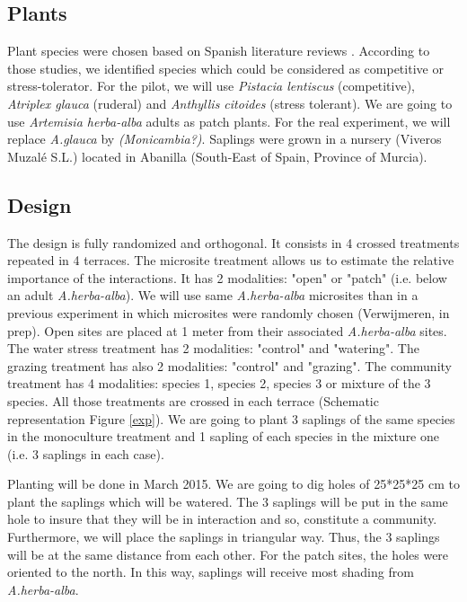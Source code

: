 \documentclass[12pt]{article} %
\begin{document}
\subsection{Plants}
Plant species were chosen based on Spanish literature reviews \citep{McCluney2012,Navarro2006, Jauffret2003}. According to those studies, we identified species which could be considered as competitive or stress-tolerator. For the pilot, we will use \textit{Pistacia lentiscus} (competitive), \textit{Atriplex glauca} (ruderal) and \textit{Anthyllis citoides} (stress tolerant). We are going to use \textit{Artemisia herba-alba} adults as patch plants. For the real experiment, we will replace \textit{A.glauca} by \textit{(Monicambia?)}. 
Saplings were grown in a nursery (Viveros Muzalé S.L.) located in Abanilla (South-East of Spain, Province of Murcia).

\subsection{Design}
The design is fully randomized and orthogonal. It consists in 4 crossed treatments repeated in 4 terraces. The microsite treatment allows us to estimate the relative importance of the interactions. It has 2 modalities: "open" or "patch" (i.e. below an adult \textit{A.herba-alba}). We will use same \textit{A.herba-alba} microsites than in a previous experiment in which microsites were randomly chosen (Verwijmeren, in prep). Open sites are placed at 1 meter from their associated \textit{A.herba-alba} sites. The water stress treatment has 2 modalities: "control" and "watering". The grazing treatment has also 2 modalities: "control" and "grazing". The community treatment has 4 modalities: species 1, species 2, species 3 or mixture of the 3 species. All those treatments are crossed in each terrace (Schematic representation Figure \ref{exp}). We are going to plant 3 saplings of the same species in the monoculture treatment and 1 sapling of each species in the mixture one (i.e. 3 saplings in each case).

Planting will be done in March 2015. We are going to dig holes of 25*25*25 cm to plant the saplings which will be watered. The 3 saplings will be put in the same hole to insure that they will be in interaction and so, constitute a community. Furthermore, we will place the saplings in triangular way. Thus, the 3 saplings will be at the same distance from each other. For the patch sites, the holes were oriented to the north. In this way, saplings will receive most shading from \textit{A.herba-alba}.
\end{document}
